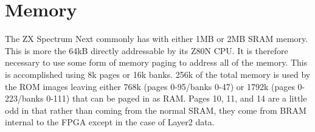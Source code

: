 \chapter{Memory}
The ZX Spectrum Next commonly has with either 1MB or 2MB SRAM
memory. This is more the 64kB directly addressable by its Z80N CPU. It
is therefore necessary to use some form of memory paging to address
all of the memory. This is accomplished using 8k pages or 16k
banks. 256k of the total memory is used by the ROM images leaving
either 768k (pages 0-95/banks 0-47) or 1792k (pages 0-223/banks 0-111)
that can be paged in as RAM. Pages 10, 11, and 14 are a little odd in
that rather than coming from the normal SRAM, they come from BRAM
internal to the FPGA except in the case of Layer2 data.



